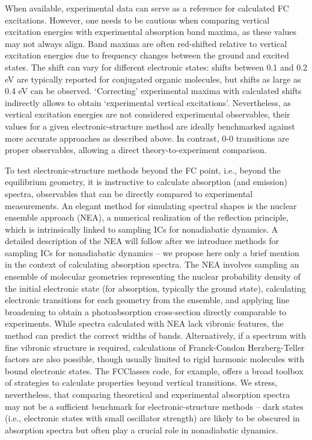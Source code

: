 \documentclass[9pt,bestpractices]{livecoms}
\begin{document}
When available, experimental data can serve as a reference for calculated FC excitations. However, one needs to be cautious when comparing vertical excitation energies with experimental absorption band maxima, as these values may not always align. Band maxima are often red-shifted relative to vertical excitation energies due to frequency changes between the ground and excited states.\cite{bai2020origin} The shift can vary for different electronic states: shifts between 0.1 and 0.2 eV are typically reported for conjugated organic molecules, but shifts as large as 0.4 eV can be observed.\cite{daday2012full} `Correcting' experimental maxima with calculated shifts indirectly allows to obtain `experimental vertical excitations'.\cite{crespo2014spectrum} Nevertheless, as vertical excitation energies are not considered experimental observables, their values for a given electronic-structure method are ideally benchmarked against more accurate approaches as described above. In contrast, 0-0 transitions are proper observables, allowing a direct theory-to-experiment comparison.\cite{jacquemin20150,winter2013benchmarks}

To test electronic-structure methods beyond the FC point, i.e., beyond the equilibrium geometry, it is instructive to calculate absorption (and emission) spectra, observables that can be directly compared to experimental measurements. An elegant method for simulating spectral shapes is the nuclear ensemble approach (NEA),\cite{crespo2014spectrum} a numerical realization of the reflection principle,\cite{schinkebook} which is intrinsically linked to sampling ICs for nonadiabatic dynamics. A detailed description of the NEA will follow after we introduce methods for sampling ICs for nonadiabatic dynamics -- we propose here only a brief mention in the context of calculating absorption spectra. The NEA involves sampling an ensemble of molecular geometries representing the nuclear probability density of the initial electronic state (for absorption, typically the ground state), calculating electronic transitions for each geometry from the ensemble, and applying line broadening to obtain a photoabsorption cross-section directly comparable to experiments. While spectra calculated with NEA lack vibronic features, the method can predict the correct widths of bands. Alternatively, if a spectrum with fine vibronic structure is required, calculations of Franck-Condon Herzberg-Teller factors are also possible, though usually limited to rigid harmonic molecules with bound electronic states.\cite{santoro2016beyondvert} The FCClasses code, for example, offers a broad toolbox of strategies to calculate properties beyond vertical transitions.\cite{cerezo2023fcclasses} We stress, nevertheless, that comparing theoretical and experimental absorption spectra may not be a sufficient benchmark for electronic-structure methods -- dark states (i.e., electronic states with small oscillator strength) are likely to be obscured in absorption spectra but often play a crucial role in nonadiabatic dynamics. 
\end{document}
